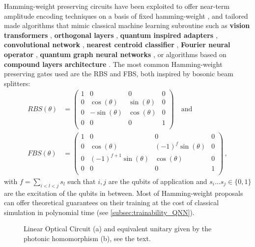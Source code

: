 \documentclass[aps,10pt,groupedaddress,prx,superscriptaddress,twocolumn,balancelastpage, tightenlines]{revtex4-2}
\theoremstyle{plain}  %
\begin{document}
Hamming-weight preserving circuits have been exploited to offer near-term
amplitude encoding techniques on a basis of fixed hamming-weight
\cite{farias_quantum_2025}, and tailored made algorithms that mimic classical
machine learning subroutine such as \textbf{vision transformers}
\cite{cherrat_quantum_2024}, \textbf{orthogonal layers}
\cite{landman_quantum_2022}, \textbf{quantum inspired adapters}
\cite{raj_hyper_2025}, \textbf{convolutional network}
\cite{monbroussou_subspace_2025}, \textbf{nearest centroid classifier}
\cite{johri_nearest_2021}, \textbf{Fourier neural operator}
\cite{jain_quantum_2024}, \textbf{quantum graph neural networks} \cite{raj_scalable_2026}, or algorithms based on \textbf{compound layers
architecture} \cite{kerenidis_quantum_2022}. The most common Hamming-weight
preserving gates used are the \gls{RBS} and \gls{FBS}, both inspired by bosonic beam splitters:
\begin{equation*}
    \begin{split}
    RBS(\theta) &= \begin{pmatrix}
            1 & 0 & 0 & 0 \\
            0 & \cos(\theta) & \sin(\theta) & 0 \\
            0 & -\sin(\theta) & \cos(\theta) & 0 \\
            0 & 0 & 0 & 1 \\
        \end{pmatrix} \quad \text{and} \\
    FBS(\theta) &= \begin{pmatrix}
            1 & 0 & 0 & 0 \\
            0 & \cos(\theta) & (-1)^{f}\sin(\theta) & 0 \\
            0 & (-1)^{f+1}\sin(\theta) & \cos(\theta) & 0 \\
            0 & 0 & 0 & 1 \\
        \end{pmatrix}\, ,        
    \end{split}
\end{equation*}
with $f = \sum_{i<l<j} s_l$ such that $i,j$ are the qubits of application and
$s_i \dots s_j \in \{0,1\}$ are the excitation of the qubits in between. Most
of Hamming-weight proposals can offer theoretical guarantees on their training
at the cost of classical simulation in polynomial time (see
\autoref{subsec:trainability_QNN}).


\begin{figure}[t!]
    \centering
    
    \caption{Linear Optical Circuit (a) and equivalent unitary given by the photonic homomorphism (b), see the text.}
    \label{fig:linear_optical_circuit}
\end{figure}
\end{document}
